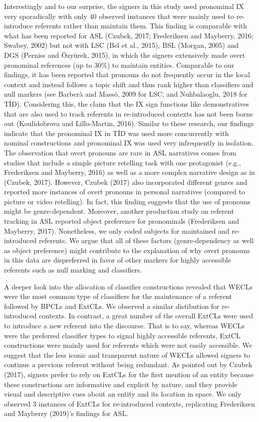 \documentclass[]{elsarticle} %
\begin{document}
Interestingly and to our surprise, the signers in this study used
pronominal IX very sporadically with only 40 observed instances that
were mainly used to re-introduce referents rather than maintain them.
This finding is comparable with what has been reported for ASL (Czubek,
2017; Frederiksen and Mayberry, 2016; Swabey, 2002) but not with LSC
(Bel et al., 2015), BSL (Morgan, 2005) and DGS (Perniss and Özyürek,
2015), in which the signers extensively made overt pronominal references
(up to 30\%) to maintain entities. Comparable to our findings, it has
been reported that pronouns do not frequently occur in the local context
and instead follows a topic shift and thus rank higher than classifiers
and null markers (see Barberà and Massó, 2009 for LSC; and Nuhbalaoglu,
2018 for TİD). Considering this, the claim that the IX sign functions
like demonstratives that are also used to track referents in
re-introduced contexts has not been borne out (Koulidobrova and
Lillo-Martin, 2016). Similar to these research, our findings indicate
that the pronominal IX in TİD was used more concurrently with nominal
constructions and pronominal IX was used very infrequently in isolation.
The observation that overt pronouns are rare in ASL narratives comes
from studies that include a simple picture retelling task with one
protagonist (e.g., Frederiksen and Mayberry, 2016) as well as a more
complex narrative design as in (Czubek, 2017). However, Czubek (2017)
also incorporated different genres and reported more instances of overt
pronouns in personal narratives (compared to picture or video
retelling). In fact, this finding suggests that the use of pronouns
might be genre-dependent. Moreover, another production study on referent
tracking in ASL reported object preference for pronominals (Frederiksen
and Mayberry, 2017). Nonetheless, we only coded subjects for maintained
and re-introduced referents. We argue that all of these factors
(genre-dependency as well as object preference) might contribute to the
explanation of why overt pronouns in this data are dispreferred in favor
of other markers for highly accessible referents such as null marking
and classifiers.

A deeper look into the allocation of classifier constructions revealed
that WECLs were the most common type of classifiers for the maintenance
of a referent followed by BPCLs and ExtCLs. We observed a similar
distibution for re-introduced contexts. In contrast, a great number of
the overall ExtCLs were used to introduce a new referent into the
discourse. That is to say, whereas WECLs were the preferred classifier
types to signal highly accessible referents, ExtCL constructions were
mainly used for referents which were not easily accessible. We suggest
that the less iconic and transparent nature of WECLs allowed signers to
continue a previous referent without being redundant. As pointed out by
Czubek (2017), signers prefer to rely on ExtCLs for the first mention of
an entity because these constructions are informative and explicit by
nature, and they provide visual and descriptive cues about an entity and
its location in space. We only observed 3 instances of ExtCLs for
re-introduced contexts, replicating Frederiksen and Mayberry (2019)'s
findings for ASL.
\end{document}
